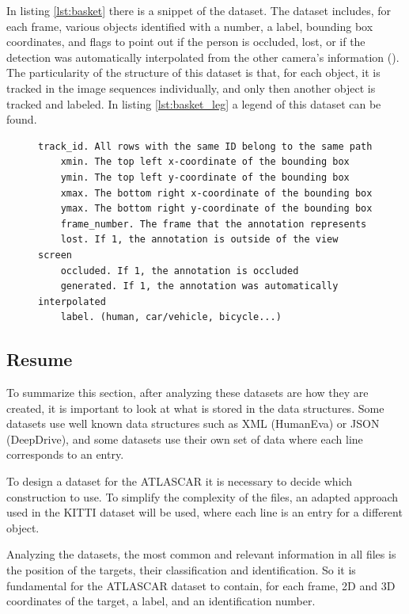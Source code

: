 In listing \ref{lst:basket} there is a snippet of the dataset. The dataset includes, for each frame, various objects identified with a number, a label, bounding box coordinates, and flags to point out if the person is occluded, lost, or if the detection was automatically interpolated from the other camera's information (\cite{EPFLEcolepolytechniquefederaledeLausanne}). The particularity of the structure of this dataset is that, for each object, it is tracked in the image sequences individually, and only then another object is tracked and labeled. In listing \ref{lst:basket_leg} a legend of this dataset can be found.

\begin{figure}[htp]

\begin{center}
	\begin{lstlisting}[label={lst:basket_leg}, caption={EPFL dataset legend.}]
	track_id. All rows with the same ID belong to the same path
	xmin. The top left x-coordinate of the bounding box
	ymin. The top left y-coordinate of the bounding box
	xmax. The bottom right x-coordinate of the bounding box
	ymax. The bottom right y-coordinate of the bounding box
	frame_number. The frame that the annotation represents
	lost. If 1, the annotation is outside of the view screen
	occluded. If 1, the annotation is occluded
	generated. If 1, the annotation was automatically interpolated
	label. (human, car/vehicle, bicycle...)	\end{lstlisting}
\end{center}

\end{figure}
 
\subsection{Resume}

To summarize this section, after analyzing these datasets are how they are created, it is important to look at what is stored in the data structures. Some datasets use well known data structures such as XML (HumanEva) or JSON (DeepDrive), and some datasets use their own set of data where each line corresponds to an entry. 

To design a dataset for the ATLASCAR it is necessary to decide which construction to use. To simplify the complexity of the files, an adapted approach used in the KITTI dataset will be used, where each line is an entry for a different object.

Analyzing the datasets, the most common and relevant information in all files is the position of the targets, their classification and identification. So it is fundamental for the ATLASCAR dataset to contain, for each frame, 2D and 3D coordinates of the target, a label, and an identification number.



